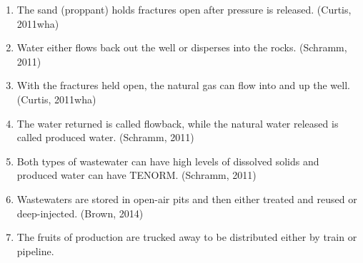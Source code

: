 \documentclass{article}
\begin{document}
\begin{enumerate}
\begin{enumerate}
\begin{enumerate}
            \end{enumerate}
          \item The sand (proppant) holds fractures open after pressure is released. (Curtis, 2011wha)
          \item Water either flows back out the well or disperses into the rocks. (Schramm, 2011)
          \item With the fractures held open, the natural gas can flow into and up the well. (Curtis, 2011wha)
          \item The water returned is called flowback, while the natural water released is called produced water. (Schramm, 2011)
          \item Both types of wastewater can have high levels of dissolved solids and produced water can have TENORM. (Schramm, 2011)
          \item Wastewaters are stored in open-air pits and then either treated and reused or deep-injected. (Brown, 2014)
          \item The fruits of production are trucked away to be distributed either by train or pipeline.
        \end{enumerate}
    \end{enumerate}
    
\end{document}
